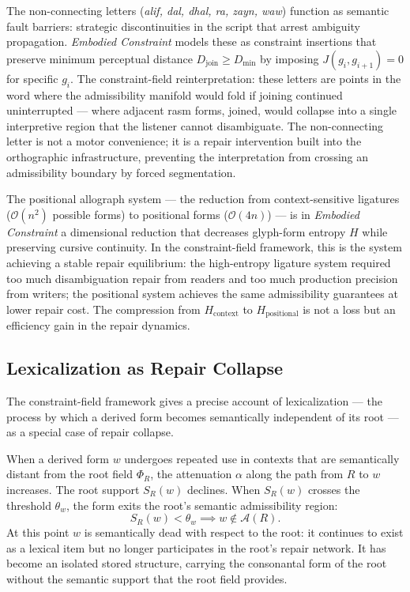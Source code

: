 \documentclass[11pt, a4paper]{article}
\theoremstyle{definition}
\theoremstyle{remark}
\begin{document}
The non-connecting letters (\textit{alif, dal, dhal, ra, zayn, waw}) function
as semantic fault barriers: strategic discontinuities in the script that
arrest ambiguity propagation. \textit{Embodied Constraint} models these as
constraint insertions that preserve minimum perceptual distance
$D_{\mathrm{join}} \geq D_{\min}$ by imposing $J(g_i, g_{i+1}) = 0$ for
specific $g_i$. The constraint-field reinterpretation: these letters are
points in the word where the admissibility manifold would fold if joining
continued uninterrupted --- where adjacent rasm forms, joined, would collapse
into a single interpretive region that the listener cannot disambiguate.
The non-connecting letter is not a motor convenience; it is a repair
intervention built into the orthographic infrastructure, preventing the
interpretation from crossing an admissibility boundary by forced segmentation.

The positional allograph system --- the reduction from context-sensitive
ligatures ($\mathcal{O}(n^2)$ possible forms) to positional forms
($\mathcal{O}(4n)$) --- is in \textit{Embodied Constraint} a dimensional
reduction that decreases glyph-form entropy $H$ while preserving cursive
continuity. In the constraint-field framework, this is the system achieving
a stable repair equilibrium: the high-entropy ligature system required too
much disambiguation repair from readers and too much production precision
from writers; the positional system achieves the same admissibility guarantees
at lower repair cost. The compression from $H_{\mathrm{context}}$ to
$H_{\mathrm{positional}}$ is not a loss but an efficiency gain in the repair
dynamics.

\subsection{Lexicalization as Repair Collapse}

The constraint-field framework gives a precise account of lexicalization ---
the process by which a derived form becomes semantically independent of its
root --- as a special case of repair collapse.

When a derived form $w$ undergoes repeated use in contexts that are
semantically distant from the root field $\Phi_R$, the attenuation $\alpha$
along the path from $R$ to $w$ increases. The root support $S_R(w)$ declines.
When $S_R(w)$ crosses the threshold $\theta_w$, the form exits the root's
semantic admissibility region:
\[
S_R(w) < \theta_w \implies w \notin \mathcal{A}(R).
\]
At this point $w$ is semantically dead with respect to the root: it continues
to exist as a lexical item but no longer participates in the root's repair
network. It has become an isolated stored structure, carrying the consonantal
form of the root without the semantic support that the root field provides.
\end{document}

